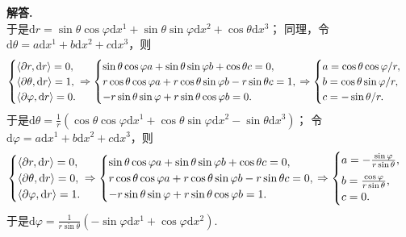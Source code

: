 \documentclass[12pt, a4paper, oneside]{ctexart}
\newenvironment{solution}[1][]{\par\noindent\textbf{#1解答. }}{\smallskip\par}  %
\def\d{\mathrm{d}}          %
\def\add{\vspace{1ex}}      %
\begin{document}
\begin{solution}
\begin{equation*}
    \end{equation*}
    于是$\d r = \sin\theta\cos\varphi \d x^1 + \sin\theta\sin\varphi\d x^2 + \cos\theta\d x^3$；
    同理，令$\d \theta = a\d x^1 + b\d x^2 + c\d x^3$，则
    \begin{equation*}
        \begin{cases}
            \langle\partial r,\d r\rangle = 0,\\
            \langle\partial \theta,\d r\rangle = 1,\\
            \langle\partial \varphi,\d r\rangle = 0.
        \end{cases}
        \hspace{-0.35cm}\Rightarrow\begin{cases}
            \sin\theta\cos\varphi a+\sin\theta\sin\varphi b + \cos\theta c = 0,\\
            r\cos\theta\cos\varphi a+r\cos\theta\sin\varphi b - r\sin\theta c = 1,\\
            -r\sin\theta\sin\varphi + r\sin\theta\cos\varphi b = 0.
        \end{cases}\hspace{-0.35cm}\Rightarrow\begin{cases}
            a = \cos\theta\cos\varphi/r,\\
            b = \cos\theta\sin\varphi/r,\\
            c = -\sin\theta/r.
        \end{cases}
    \end{equation*}
    于是$\d \theta = \frac{1}{r}(\cos\theta\cos\varphi\d x^1 + \cos\theta\sin\varphi\d x^2 - \sin\theta\d x^3)$；
    令$\d \varphi = a\d x^1 + b\d x^2 + c\d x^3$，则
    \begin{equation*}
        \begin{cases}
            \langle\partial r,\d r\rangle = 0,\\
            \langle\partial \theta,\d r\rangle = 0,\\
            \langle\partial \varphi,\d r\rangle = 1.
        \end{cases}
        \hspace{-0.35cm}\Rightarrow\begin{cases}
            \sin\theta\cos\varphi a+\sin\theta\sin\varphi b + \cos\theta c = 0,\\
            r\cos\theta\cos\varphi a+r\cos\theta\sin\varphi b - r\sin\theta c = 0,\\
            -r\sin\theta\sin\varphi + r\sin\theta\cos\varphi b = 1.
        \end{cases}\hspace{-0.35cm}\Rightarrow\begin{cases}
            a = -\frac{\sin\varphi}{r\sin\theta},\add\\
            b = \frac{\cos\varphi}{r\sin\theta},\\
            c = 0.
        \end{cases}
    \end{equation*}
    于是$\d \varphi = \frac{1}{r\sin\theta}(-\sin\varphi\d x^1 + \cos\varphi\d x^2)$.\add
\end{solution}
\end{document}
